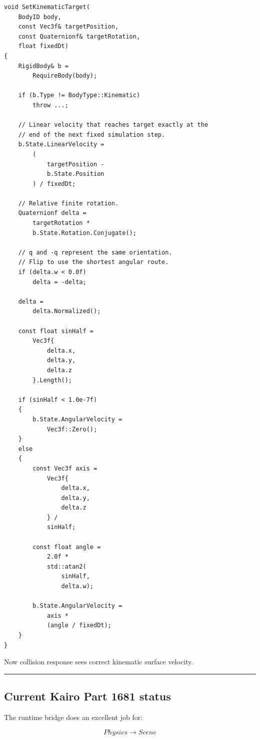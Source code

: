 \begin{verbatim}
void SetKinematicTarget(
    BodyID body,
    const Vec3f& targetPosition,
    const Quaternionf& targetRotation,
    float fixedDt)
{
    RigidBody& b =
        RequireBody(body);

    if (b.Type != BodyType::Kinematic)
        throw ...;

    // Linear velocity that reaches target exactly at the
    // end of the next fixed simulation step.
    b.State.LinearVelocity =
        (
            targetPosition -
            b.State.Position
        ) / fixedDt;

    // Relative finite rotation.
    Quaternionf delta =
        targetRotation *
        b.State.Rotation.Conjugate();

    // q and -q represent the same orientation.
    // Flip to use the shortest angular route.
    if (delta.w < 0.0f)
        delta = -delta;

    delta =
        delta.Normalized();

    const float sinHalf =
        Vec3f{
            delta.x,
            delta.y,
            delta.z
        }.Length();

    if (sinHalf < 1.0e-7f)
    {
        b.State.AngularVelocity =
            Vec3f::Zero();
    }
    else
    {
        const Vec3f axis =
            Vec3f{
                delta.x,
                delta.y,
                delta.z
            } /
            sinHalf;

        const float angle =
            2.0f *
            std::atan2(
                sinHalf,
                delta.w);

        b.State.AngularVelocity =
            axis *
            (angle / fixedDt);
    }
}
\end{verbatim}

Now collision response sees correct kinematic surface velocity.

\begin{center}\rule{0.5\linewidth}{0.5pt}\end{center}

\subsection{Current Kairo Part 1681 status}\label{06-engine-ii-ch037-current-kairo-part-1681-status}

The runtime bridge does an excellent job for:

\[
Physics\rightarrow Scene
\]

